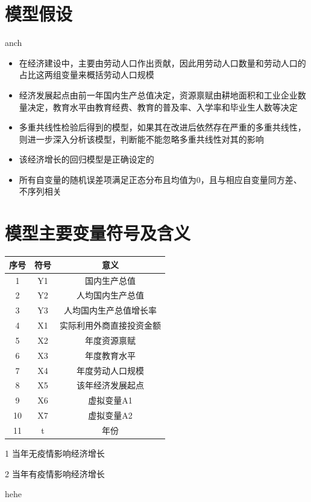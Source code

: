 \documentclass[UTF8]{article}
\begin{document}
	\section{模型假设}
		anch
	\begin{itemize}
		\item 在经济建设中，主要由劳动人口作出贡献，因此用劳动人口数量和劳动人口的占比这两组变量来概括劳动人口规模
		\item 经济发展起点由前一年国内生产总值决定，资源禀赋由耕地面积和工业企业数量决定，教育水平由教育经费、教育的普及率、入学率和毕业生人数等决定
		\item 多重共线性检验后得到的模型，如果其在改进后依然存在严重的多重共线性，则进一步深入分析该模型，判断能不能忽略多重共线性对其的影响
		\item 该经济增长的回归模型是正确设定的
		\item 所有自变量的随机误差项满足正态分布且均值为0，且与相应自变量同方差、不序列相关
	\end{itemize}
	\section{模型主要变量符号及含义}
		\begin{center}
			\begin{threeparttable}
				\setlength{\tabcolsep}{10mm}
				\begin{tabular}{ccc}
				\hline
				序号 & 符号 & 意义\\
				\hline
				1 & Y1 & 国内生产总值\\
				2 & Y2 & 人均国内生产总值\\
				3 & Y3 & 人均国内生产总值增长率\\
				4 & X1 & 实际利用外商直接投资金额\\
				5 & X2 & 年度资源禀赋\\
				6 & X3 & 年度教育水平\\
				7 & X4 & 年度劳动人口规模\\
				8 & X5 & 该年经济发展起点\\
				9 & X6 & 虚拟变量A1\tnote{1}\\
				10 & X7 & 虚拟变量A2\tnote{2}\\
				11 & t & 年份\\
				\hline
				\end{tabular}
				\begin{tablenotes}
					\item [1] 当年无疫情影响经济增长
					\item [2] 当年有疫情影响经济增长
				\end{tablenotes}
			\end{threeparttable}
		\end{center}
		hehe
\end{document}
